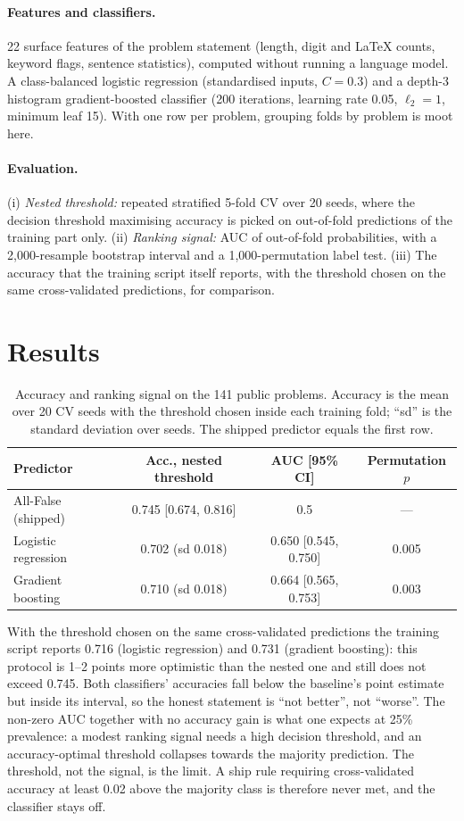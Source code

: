 \documentclass{article}
\begin{document}
\paragraph{Features and classifiers.} 22 surface features of the problem statement (length, digit and LaTeX counts, keyword flags, sentence statistics), computed without running a language model.
A class-balanced logistic regression (standardised inputs, $C=0.3$) and a depth-3 histogram gradient-boosted classifier (200 iterations, learning rate 0.05, $\ell_2=1$, minimum leaf 15).
With one row per problem, grouping folds by problem is moot here.

\paragraph{Evaluation.} (i) \emph{Nested threshold:} repeated stratified 5-fold CV over 20 seeds, where the decision threshold maximising accuracy is picked on out-of-fold predictions of the training part only.
(ii) \emph{Ranking signal:} AUC of out-of-fold probabilities, with a 2,000-resample bootstrap interval and a 1,000-permutation label test.
(iii) The accuracy that the training script itself reports, with the threshold chosen on the same cross-validated predictions, for comparison.

\section{Results}
\begin{table}[h]
\centering\small
\begin{tabular}{@{}lccc@{}}
\toprule
Predictor & Acc., nested threshold & AUC [95\% CI] & Permutation $p$ \\
\midrule
All-False (shipped) & 0.745 [0.674, 0.816] & 0.5 & --- \\
Logistic regression & 0.702 (sd 0.018) & 0.650 [0.545, 0.750] & 0.005 \\
Gradient boosting & 0.710 (sd 0.018) & 0.664 [0.565, 0.753] & 0.003 \\
\bottomrule
\end{tabular}
\caption{Accuracy and ranking signal on the 141 public problems. Accuracy is the mean over 20 CV seeds with the threshold chosen inside each training fold; ``sd'' is the standard deviation over seeds. The shipped predictor equals the first row.}
\end{table}

With the threshold chosen on the same cross-validated predictions the training script reports 0.716 (logistic regression) and 0.731 (gradient boosting): this protocol is 1--2 points more optimistic than the nested one and still does not exceed 0.745.
Both classifiers' accuracies fall below the baseline's point estimate but inside its interval, so the honest statement is ``not better'', not ``worse''.
The non-zero AUC together with no accuracy gain is what one expects at 25\% prevalence: a modest ranking signal needs a high decision threshold, and an accuracy-optimal threshold collapses towards the majority prediction. The threshold, not the signal, is the limit.
A ship rule requiring cross-validated accuracy at least 0.02 above the majority class is therefore never met, and the classifier stays off.
\end{document}
